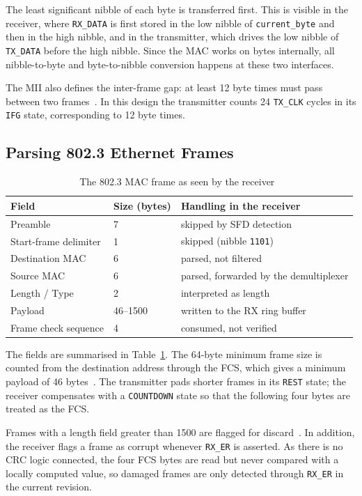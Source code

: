 \documentclass[11pt,a4paper]{article}
\begin{document}
The least significant nibble of each byte is transferred first. This is visible in the receiver, where \texttt{RX\_DATA} is first stored in the low nibble of \texttt{current\_byte} and then in the high nibble, and in the transmitter, which drives the low nibble of \texttt{TX\_DATA} before the high nibble. Since the MAC works on bytes internally, all nibble-to-byte and byte-to-nibble conversion happens at these two interfaces.

The MII also defines the inter-frame gap: at least 12 byte times must pass between two frames~\cite{ieee8023}. In this design the transmitter counts 24 \texttt{TX\_CLK} cycles in its \texttt{IFG} state, corresponding to 12 byte times.

\subsection{Parsing 802.3 Ethernet Frames}
\begin{table}[htbp]
    \centering
    \begin{tabular}{lll}
    \hline
    Field & Size (bytes) & Handling in the receiver \\
    \hline
    Preamble & 7 & skipped by SFD detection \\
    Start-frame delimiter & 1 & skipped (nibble \texttt{1101}) \\
    Destination MAC & 6 & parsed, not filtered \\
    Source MAC & 6 & parsed, forwarded by the demultiplexer \\
    Length / Type & 2 & interpreted as length \\
    Payload & 46--1500 & written to the RX ring buffer \\
    Frame check sequence & 4 & consumed, not verified \\
    \hline
    \end{tabular}
    \caption{The 802.3 MAC frame as seen by the receiver~\cite{ieee8023}}
    \label{tab:frame}
\end{table}

The fields are summarised in Table~\ref{tab:frame}. The 64-byte minimum frame size is counted from the destination address through the FCS, which gives a minimum payload of 46 bytes~\cite{ieee8023}. The transmitter pads shorter frames in its \texttt{REST} state; the receiver compensates with a \texttt{COUNTDOWN} state so that the following four bytes are treated as the FCS.

Frames with a length field greater than 1500 are flagged for discard~\cite{ieee8023}. In addition, the receiver flags a frame as corrupt whenever \texttt{RX\_ER} is asserted. As there is no CRC logic connected, the four FCS bytes are read but never compared with a locally computed value, so damaged frames are only detected through \texttt{RX\_ER} in the current revision.
\end{document}
